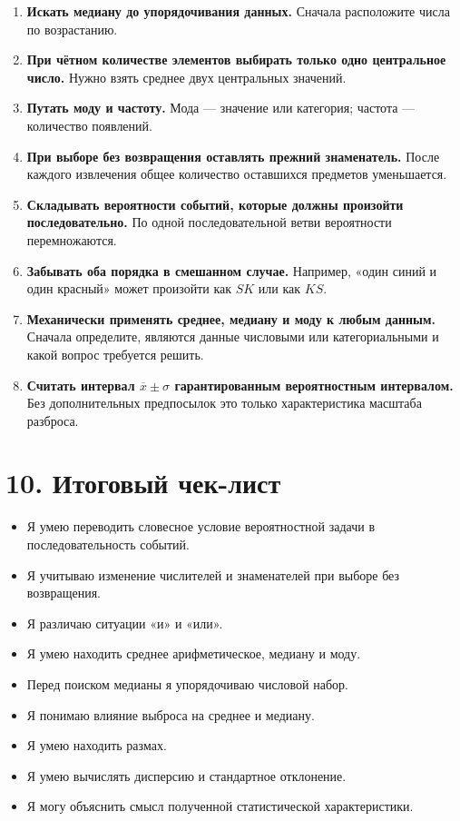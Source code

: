 \documentclass[a4paper,12pt]{article}
\newcommand{\key}[1]{\textcolor{darkaccent}{\textbf{#1}}}
\begin{document}
\begin{enumerate}
    \item \key{Искать медиану до упорядочивания данных.} Сначала расположите числа по возрастанию.

    \item \key{При чётном количестве элементов выбирать только одно центральное число.} Нужно взять среднее двух центральных значений.

    \item \key{Путать моду и частоту.} Мода --- значение или категория; частота --- количество появлений.

    \item \key{При выборе без возвращения оставлять прежний знаменатель.} После каждого извлечения общее количество оставшихся предметов уменьшается.

    \item \key{Складывать вероятности событий, которые должны произойти последовательно.} По одной последовательной ветви вероятности перемножаются.

    \item \key{Забывать оба порядка в смешанном случае.} Например, «один синий и один красный» может произойти как $SK$ или как $KS$.

    \item \key{Механически применять среднее, медиану и моду к любым данным.} Сначала определите, являются данные числовыми или категориальными и какой вопрос требуется решить.

    \item \key{Считать интервал $\overline{x}\pm\sigma$ гарантированным вероятностным интервалом.} Без дополнительных предпосылок это только характеристика масштаба разброса.
\end{enumerate}

\section*{10. Итоговый чек-лист}

\begin{itemize}
    \item[$\square$] Я умею переводить словесное условие вероятностной задачи в последовательность событий.
    \item[$\square$] Я учитываю изменение числителей и знаменателей при выборе без возвращения.
    \item[$\square$] Я различаю ситуации «и» и «или».
    \item[$\square$] Я умею находить среднее арифметическое, медиану и моду.
    \item[$\square$] Перед поиском медианы я упорядочиваю числовой набор.
    \item[$\square$] Я понимаю влияние выброса на среднее и медиану.
    \item[$\square$] Я умею находить размах.
    \item[$\square$] Я умею вычислять дисперсию и стандартное отклонение.
    \item[$\square$] Я могу объяснить смысл полученной статистической характеристики.
\end{itemize}
\end{document}
